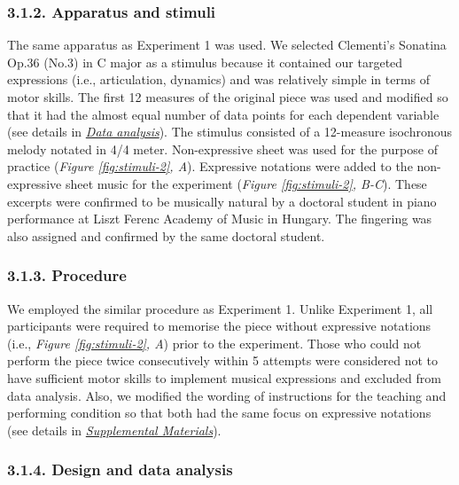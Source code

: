 \documentclass[
  english,
  man,floatsintext]{apa6}
\begin{document}
\hypertarget{apparatus-and-stimuli-1}{%
\subsubsection{3.1.2. Apparatus and stimuli}\label{apparatus-and-stimuli-1}}

The same apparatus as Experiment 1 was used. We selected Clementi's Sonatina Op.36 (No.3) in C major as a stimulus because it contained our targeted expressions (i.e., articulation, dynamics) and was relatively simple in terms of motor skills. The first 12 measures of the original piece was used and modified so that it had the almost equal number of data points for each dependent variable (see details in \emph{\protect\hyperlink{analysis-2}{Data analysis}}). The stimulus consisted of a 12-measure isochronous melody notated in 4/4 meter. Non-expressive sheet was used for the purpose of practice (\emph{Figure \ref{fig:stimuli-2}, A}). Expressive notations were added to the non-expressive sheet music for the experiment (\emph{Figure \ref{fig:stimuli-2}, B-C}). These excerpts were confirmed to be musically natural by a doctoral student in piano performance at Liszt Ferenc Academy of Music in Hungary. The fingering was also assigned and confirmed by the same doctoral student.

\hypertarget{procedure-2}{%
\subsubsection{3.1.3. Procedure}\label{procedure-2}}

We employed the similar procedure as Experiment 1. Unlike Experiment 1, all participants were required to memorise the piece without expressive notations (i.e., \emph{Figure \ref{fig:stimuli-2}, A}) prior to the experiment. Those who could not perform the piece twice consecutively within 5 attempts were considered not to have sufficient motor skills to implement musical expressions and excluded from data analysis. Also, we modified the wording of instructions for the teaching and performing condition so that both had the same focus on expressive notations (see details in \emph{\protect\hyperlink{supplemental}{Supplemental Materials}}).

\hypertarget{design-and-data-analysis-1}{%
\subsubsection{3.1.4. Design and data analysis}\label{design-and-data-analysis-1}}
\end{document}
